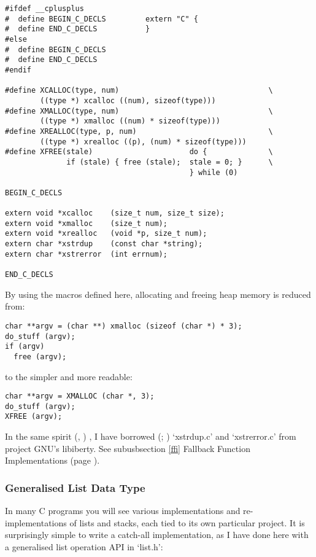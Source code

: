 \begin{Verbatim}[frame=single]
#ifdef __cplusplus
#  define BEGIN_C_DECLS         extern "C" {
#  define END_C_DECLS           }
#else
#  define BEGIN_C_DECLS
#  define END_C_DECLS
#endif

#define XCALLOC(type, num)                                  \
        ((type *) xcalloc ((num), sizeof(type)))
#define XMALLOC(type, num)                                  \
        ((type *) xmalloc ((num) * sizeof(type)))
#define XREALLOC(type, p, num)                              \
        ((type *) xrealloc ((p), (num) * sizeof(type)))
#define XFREE(stale)                      do {              \
              if (stale) { free (stale);  stale = 0; }      \
                                          } while (0)

BEGIN_C_DECLS

extern void *xcalloc    (size_t num, size_t size);
extern void *xmalloc    (size_t num);
extern void *xrealloc   (void *p, size_t num);
extern char *xstrdup    (const char *string);
extern char *xstrerror  (int errnum);

END_C_DECLS
\end{Verbatim}
By using the macros defined here, allocating and freeing heap memory is reduced from: 
\begin{Verbatim}[frame=single]
char **argv = (char **) xmalloc (sizeof (char *) * 3);
do_stuff (argv);
if (argv)
  free (argv);
\end{Verbatim}

to the simpler and more readable: 
\begin{Verbatim}[frame=single]
char **argv = XMALLOC (char *, 3);
do_stuff (argv);
XFREE (argv);
\end{Verbatim}
In the same spirit ({\McQ\cH23}, {\MbQ{}}) , I have borrowed ({\MaQ{}}; {\MbQ{}}) `xstrdup.c' 
and `xstrerror.c' from project GNU's libiberty. See subusbsection \ref{ffi}
Fallback Function Implementations (page \pageref{ffi}). 

\subsubsection{Generalised List Data Type}

In many C programs you will see various implementations and re-implementations 
of lists and stacks, each tied to its own particular project. It is 
surprisingly simple to write a catch-all implementation, as I have done here 
with a generalised list operation API in `list.h': 

